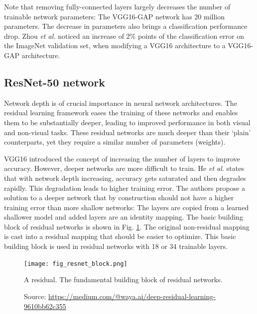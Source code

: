 Note that removing fully-connected layers largely decreases the number of trainable network parameters: The VGG16-GAP network has 20 million parameters. The decrease in parameters also brings a classification performance drop. Zhou \textit{et al.} noticed an increase of 2\% points of the classification error on the ImageNet validation set, when modifying a VGG16 architecture to a VGG16-GAP architecture. 

\subsection{ResNet-50 network}
Network depth is of crucial importance in neural network architectures. The residual learning framework eases the training of these networks and enables them to be substantially deeper, leading to improved performance in both visual and non-visual tasks. These residual networks are much deeper than their ‘plain’ counterparts, yet they require a similar number of parameters (weights).

VGG16 introduced the concept of increasing the number of layers to improve accuracy. However, deeper networks are more difficult to train. He \textit{et al.} \cite{he2016deep} states that with network depth increasing, accuracy gets saturated and then degrades rapidly. This degradation leads to higher training error. The authors propose a solution to a deeper network that by construction should not have a higher training error than more shallow networks: The layers are copied from a learned shallower model and added layers are an identity mapping. The basic building block of residual networks is shown in Fig. \ref{fig:resnet_block}. The original non-residual mapping is cast into a residual mapping that should be easier to optimize. This basic building block is used in residual networks with 18 or 34 trainable layers. 
\begin{figure}[ht]
    \begin{center}       
    \texttt{[image: fig\_resnet\_block.png]}
    \caption[Residual block]{A residual. The fundamental building block of residual networks.}
    \caption*{Source: \href{https://medium.com/@waya.ai/deep-residual-learning-9610bb62c355}{https://medium.com/@waya.ai/deep-residual-learning-9610bb62c355}}
    \label{fig:resnet_block}
    \end{center}
\end{figure}


